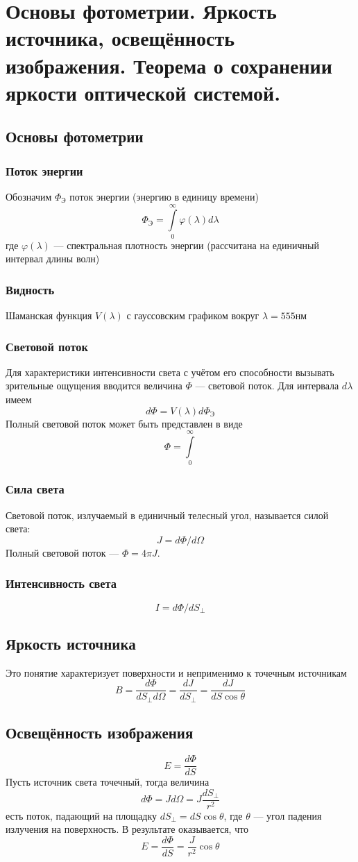 \section{Основы фотометрии. Яркость источника, освещённость изображения. Теорема о сохранении яркости оптической системой.}
\subsection{Основы фотометрии}
\subsubsection{Поток энергии}
Обозначим $\Phi_Э$ поток энергии (энергию в единицу времени)
$$\Phi_Э = \int\limits_{0}^{\infty} \varphi(\lambda) d \lambda$$
где $\varphi(\lambda)$ --- спектральная плотность энергии (рассчитана на единичный интервал длины волн)
\subsubsection{Видность}
Шаманская функция $V(\lambda)$ с гауссовским графиком вокруг $\lambda = 555нм$
\subsubsection{Световой поток}
Для характеристики интенсивности света с учётом его способности вызывать зрительные ощущения вводится величина $\Phi$ --- световой поток. Для интервала $d \lambda$ имеем
$$d\Phi = V(\lambda) d \Phi_Э$$
Полный световой поток может быть представлен в виде
$$\Phi = \int\limits_{0}^{\infty}$$
\subsubsection{Сила света}
Световой поток, излучаемый в единичный телесный угол, называется силой света:
$$J = d \Phi / d \Omega$$
Полный световой поток --- $\Phi = 4\pi J$.
\subsubsection{Интенсивность света}
$$I = d \Phi / d S_{\perp}$$
\subsection{Яркость источника}
Это понятие характеризует поверхности и неприменимо к точечным источникам
$$B = \frac{d \Phi}{d S_{\perp} d \Omega} = \frac{d J }{d S_{\perp}} = \frac{d J}{d S \cos \theta }$$
\subsection{Освещённость изображения}
$$E = \frac{d \Phi}{d S}$$
Пусть источник света точечный, тогда величина
$$d \Phi = J d \Omega = J \frac{dS_{\perp}}{r^2}$$
есть поток, падающий на площадку $dS_{\perp}  = dS\cos\theta$, где $\theta$ --- угол падения излучения на поверхность. В результате оказывается, что 
$$E = \frac{d\Phi}{dS} = \frac{J}{r^2} \cos \theta$$
